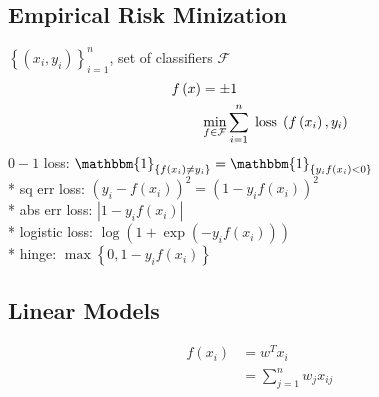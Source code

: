 \documentclass{article}
\begin{document}
\subsection{Empirical Risk Minization}
$\left\{\left(x_{i}, y_{i}\right)\right\}_{i=1}^{n}$, set of classifiers $\mathcal{F}$
\begin{align*}
f\left(x\right)  &= \pm 1
\\ &\displaystyle\min_{f \in \mathcal{F}} \displaystyle\sum_{i=1}^{n} \text{\;loss\;} \left(f\left(x_{i}\right), y_{i}\right)
\end{align*}
$0-1$ loss: $\mathbbm{1}_{\left\{f\left(x_{i}\right) \neq  y_{i}\right\}} = \mathbbm{1}_{\left\{y_{i} f\left(x_{i}\right) < 0\right\}}$
\\* sq err loss: $\left(y_{i} - f\left(x_{i}\right)\right)^{2} = \left(1 - y_{i} f\left(x_{i}\right)\right)^{2}$
\\* abs err loss: $| 1 - y_{i} f\left(x_{i}\right) |$
\\* logistic loss: $\log\left(1 + \exp\left(- y_{i} f\left(x_{i}\right)\right)\right)$
\\* hinge: $\displaystyle\max\left\{0, 1 - y_{i} f\left(x_{i}\right)\right\}$



\subsection{Linear Models}
\begin{align*}
f\left(x_{i}\right)  &= w^{T} x_{i}
\\ &= \displaystyle\sum_{j=1}^{n} w_{j} x_{ij}
\end{align*}
\end{document}
